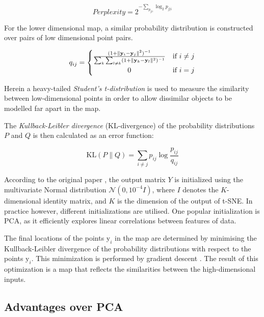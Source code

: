 \begin{equation}
	\label{eq:tsne:perlexity}
	Perplexity = 2^{-\sum_{p_{j|i}} \log_2 p_{j|i}}
\end{equation}

For the lower dimensional map, a similar probability distribution is constructed over pairs of low dimensional point pairs.

\begin{equation}
	\label{eq:tsne:qij}
	q_{ij} =
	\begin{cases}
		{\frac{(1+\lVert \mathbf{y}_{i} - \mathbf{y}_{j}\rVert^{2})^{-1}}{\sum_{k}\sum_{l \neq k}(1+\lVert \mathbf{y}_{k} - \mathbf{y}_{l}\rVert ^{2})^{-1}}} & \textrm{if } i \neq j \\
		\hfil 0 & \textrm{if } i = j
	\end{cases}
\end{equation}

Herein a heavy-tailed \textit{Student's t-distribution} is used to measure the similarity between low-dimensional points in order to allow dissimilar objects to be modelled far apart in the map.

The \textit{Kullback-Leibler divergence} (KL-divergence)\cite{bib:kldiv} of the probability distributions $P$ and $Q$ is then calculated as an error function:

\begin{equation}
	\label{eq:KLdiv}
 	\mathrm{KL} \left(P \parallel Q \right) = \sum_{i\neq j} p_{ij} \log{\frac{p_{ij}}{q_{ij}}}
\end{equation}

According to the original paper \cite{bib:tsne}, the output matrix $Y$ is initialized using the multivariate Normal distribution  $\mathcal{N}(0,10^{-4}I)$, where $I$ denotes the $K$-dimensional identity matrix, and $K$ is the dimension of the output of t-SNE. In practice however, different initializations are utilised. One popular initialization is PCA, as it efficiently explores linear correlations between features of data.

The final locations of the points $\mathrm{y}_i$ in the map are determined by minimising the Kullback-Leibler divergence of the probability distributions with respect to the points $\mathrm{y}_i$. This minimization is performed by gradient descent \cite{bib:gd}. The result of this optimization is a map that reflects the similarities between the high-dimensional inputs.

\subsection{Advantages over PCA}

